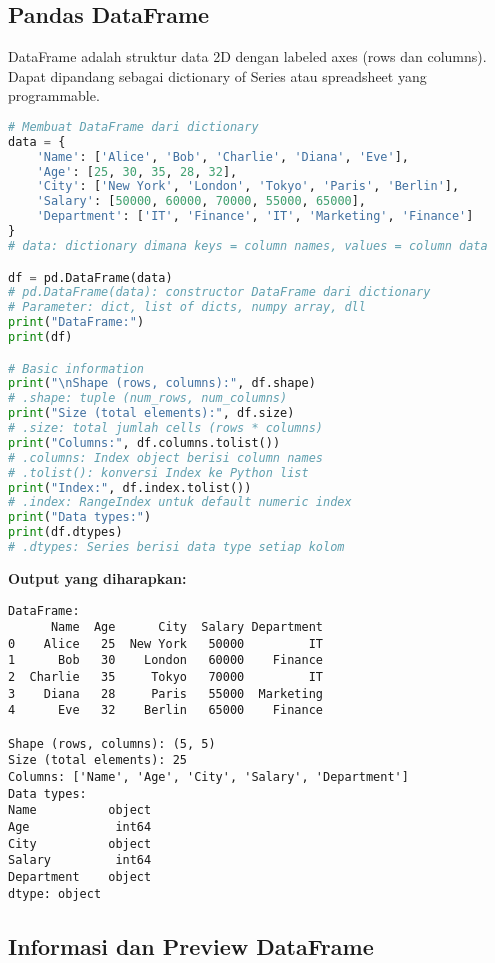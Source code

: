 \subsection*{Pandas DataFrame}

DataFrame adalah struktur data 2D dengan labeled axes (rows dan columns). Dapat dipandang sebagai dictionary of Series atau spreadsheet yang programmable.

\begin{lstlisting}[language=python, caption={Membuat dan Eksplorasi DataFrame}, style=python]
# Membuat DataFrame dari dictionary
data = {
    'Name': ['Alice', 'Bob', 'Charlie', 'Diana', 'Eve'],
    'Age': [25, 30, 35, 28, 32],
    'City': ['New York', 'London', 'Tokyo', 'Paris', 'Berlin'],
    'Salary': [50000, 60000, 70000, 55000, 65000],
    'Department': ['IT', 'Finance', 'IT', 'Marketing', 'Finance']
}
# data: dictionary dimana keys = column names, values = column data

df = pd.DataFrame(data)
# pd.DataFrame(data): constructor DataFrame dari dictionary
# Parameter: dict, list of dicts, numpy array, dll
print("DataFrame:")
print(df)

# Basic information
print("\nShape (rows, columns):", df.shape)
# .shape: tuple (num_rows, num_columns)
print("Size (total elements):", df.size)
# .size: total jumlah cells (rows * columns)
print("Columns:", df.columns.tolist())
# .columns: Index object berisi column names
# .tolist(): konversi Index ke Python list
print("Index:", df.index.tolist())
# .index: RangeIndex untuk default numeric index
print("Data types:")
print(df.dtypes)
# .dtypes: Series berisi data type setiap kolom
\end{lstlisting}

\textbf{Output yang diharapkan:}
\begin{lstlisting}[style=bash]
DataFrame:
      Name  Age      City  Salary Department
0    Alice   25  New York   50000         IT
1      Bob   30    London   60000    Finance
2  Charlie   35     Tokyo   70000         IT
3    Diana   28     Paris   55000  Marketing
4      Eve   32    Berlin   65000    Finance

Shape (rows, columns): (5, 5)
Size (total elements): 25
Columns: ['Name', 'Age', 'City', 'Salary', 'Department']
Data types:
Name          object
Age            int64
City          object
Salary         int64
Department    object
dtype: object
\end{lstlisting}

\subsection*{Informasi dan Preview DataFrame}

